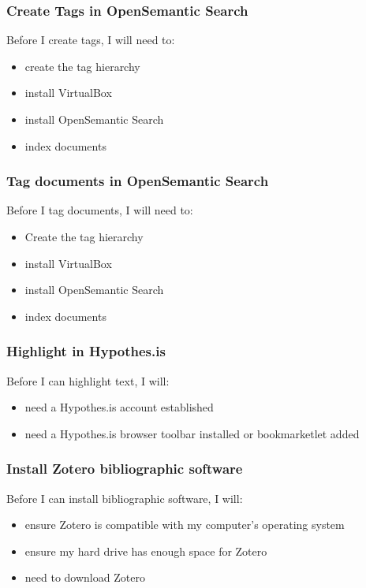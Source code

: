 \documentclass{article}
\begin{document}
\subsubsection*{Create Tags in OpenSemantic Search}

Before I create tags, I will need to:
\begin{itemize}
\item create the tag hierarchy
\item install VirtualBox
\item install OpenSemantic Search
\item index documents
\end{itemize}

\subsubsection*{Tag documents in OpenSemantic Search}

Before I tag documents, I will need to:
\begin{itemize}
\item Create the tag hierarchy
\item install VirtualBox
\item install OpenSemantic Search
\item index documents
\end{itemize}

\subsubsection*{Highlight in Hypothes.is}

Before I can highlight text, I will:
\begin{itemize}
\item need a Hypothes.is account established
\item need a Hypothes.is browser toolbar installed or bookmarketlet added
\end{itemize}

\subsubsection*{Install Zotero bibliographic software}
Before I can install bibliographic software, I will:
\begin{itemize}
\item ensure Zotero is compatible with my computer's operating system
\item ensure my hard drive has enough space for Zotero
\item need to download Zotero
\end{itemize}
\end{document}
